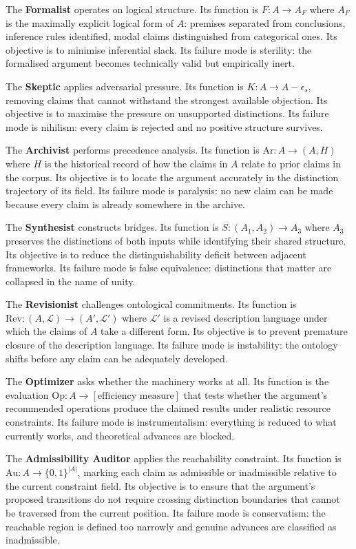 \documentclass[12pt, letterpaper]{article}
\theoremstyle{remark}
\begin{document}
The \textbf{Formalist} operates on logical structure.  Its function is
$F: A \to A_F$ where $A_F$ is the maximally explicit logical form of $A$:
premises separated from conclusions, inference rules identified, modal claims
distinguished from categorical ones.  Its objective is to minimise inferential
slack.  Its failure mode is sterility: the formalised argument becomes
technically valid but empirically inert.

The \textbf{Skeptic} applies adversarial pressure.  Its function is
$K: A \to A - \epsilon_s$, removing claims that cannot withstand the strongest
available objection.  Its objective is to maximise the pressure on unsupported
distinctions.  Its failure mode is nihilism: every claim is rejected and no
positive structure survives.

The \textbf{Archivist} performs precedence analysis.  Its function is
$\mathrm{Ar}: A \to (A, H)$ where $H$ is the historical record of how the
claims in $A$ relate to prior claims in the corpus.  Its objective is to
locate the argument accurately in the distinction trajectory of its field.
Its failure mode is paralysis: no new claim can be made because every claim
is already somewhere in the archive.

The \textbf{Synthesist} constructs bridges.  Its function is
$S: (A_1, A_2) \to A_3$ where $A_3$ preserves the distinctions of both inputs
while identifying their shared structure.  Its objective is to reduce the
distinguishability deficit between adjacent frameworks.  Its failure mode is
false equivalence: distinctions that matter are collapsed in the name of unity.

The \textbf{Revisionist} challenges ontological commitments.  Its function is
$\mathrm{Rev}: (A, \mathcal{L}) \to (A', \mathcal{L}')$ where $\mathcal{L}'$
is a revised description language under which the claims of $A$ take a
different form.  Its objective is to prevent premature closure of the
description language.  Its failure mode is instability: the ontology shifts
before any claim can be adequately developed.

The \textbf{Optimizer} asks whether the machinery works at all.  Its function
is the evaluation $\mathrm{Op}: A \to [\text{efficiency measure}]$ that tests
whether the argument's recommended operations produce the claimed results under
realistic resource constraints.  Its failure mode is instrumentalism:
everything is reduced to what currently works, and theoretical advances are
blocked.

The \textbf{Admissibility Auditor} applies the reachability constraint.  Its
function is $\mathrm{Au}: A \to \{0,1\}^{|A|}$, marking each claim as
admissible or inadmissible relative to the current constraint field.  Its
objective is to ensure that the argument's proposed transitions do not require
crossing distinction boundaries that cannot be traversed from the current
position.  Its failure mode is conservatism: the reachable region is defined
too narrowly and genuine advances are classified as inadmissible.
\end{document}
